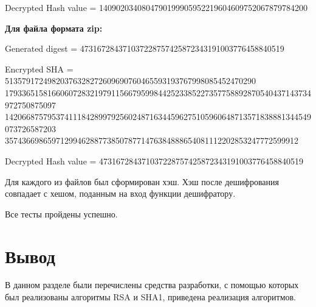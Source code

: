 Decrypted Hash value = 1409020340804790199905952219604609752067879784200

\textbf{Для файла формата zip:}

Generated digest = 473167284371037228757425872343191003776458840519

Encrypted SHA = 51357917249820376328272609690760465593193767998085452470290\\179336515816606072832197911566795998442523385227357758892870540437143734972750875097\\142066875795374111842899792560248716344596275105960648713571838881344549073726587203\\357436698659712994628877385078771476384888654081112202853247772599912

Decrypted Hash value = 473167284371037228757425872343191003776458840519

Для каждого из файлов был сформирован хэш. Хэш после дешифрования совпадает с хешом, поданным на вход функции дешифратору.

Все тесты пройдены успешно.

\section*{Вывод}
В данном разделе были перечислены средства разработки, с помощью которых был реализованы алгоритмы RSA и SHA1, приведена реализация алгоритмов.


